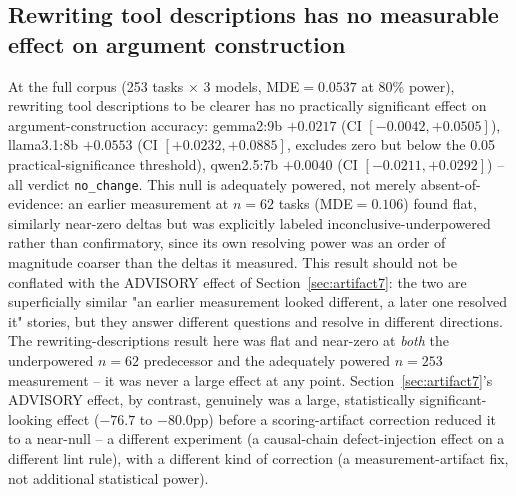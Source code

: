 \documentclass[11pt]{article}
\begin{document}
\subsection{Rewriting tool descriptions has no measurable effect on argument construction}
At the full corpus (253 tasks $\times$ 3 models, MDE$=0.0537$ at 80\% power), rewriting tool
descriptions to be clearer has no practically significant effect on argument-construction
accuracy: gemma2:9b $+0.0217$ (CI $[-0.0042,+0.0505]$), llama3.1:8b $+0.0553$ (CI
$[+0.0232,+0.0885]$, excludes zero but below the 0.05 practical-significance threshold), qwen2.5:7b
$+0.0040$ (CI $[-0.0211,+0.0292]$) -- all verdict \texttt{no\_change}.
This null is adequately powered, not merely absent-of-evidence: an earlier measurement at $n=62$
tasks (MDE$=0.106$) found flat, similarly near-zero deltas but was explicitly labeled
inconclusive-underpowered rather than confirmatory, since its own resolving power was an order of
magnitude coarser than the deltas it measured.
This result should not be conflated with the ADVISORY effect of Section~\ref{sec:artifact7}: the
two are superficially similar "an earlier measurement looked different, a later one resolved it"
stories, but they answer different questions and resolve in different directions. The
rewriting-descriptions result here was flat and near-zero at \emph{both} the underpowered $n=62$
predecessor and the adequately powered $n=253$ measurement -- it was never a large effect at any
point. Section~\ref{sec:artifact7}'s ADVISORY effect, by contrast, genuinely was a large,
statistically significant-looking effect ($-76.7$ to $-80.0$pp) before a scoring-artifact
correction reduced it to a near-null -- a different experiment (a causal-chain defect-injection
effect on a different lint rule), with a different kind of correction (a measurement-artifact fix,
not additional statistical power).
\end{document}
